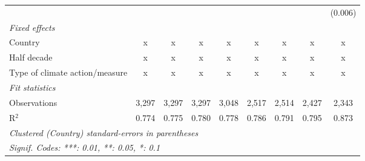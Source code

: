 \begin{table}[htbp]
\begin{tabular}{lcccccccc}
                                                                               &         &         &               &               &                &                &                & (0.006)\\   
      \emph{Fixed effects}\\
      Country                                                                  & x       & x       & x             & x             & x              & x              & x              & x\\  
      Half decade                                                              & x       & x       & x             & x             & x              & x              & x              & x\\  
      Type of climate action/measure                                           & x       & x       & x             & x             & x              & x              & x              & x\\  
      \midrule \emph{Fit statistics}\\
      Observations                                                             & 3,297   & 3,297   & 3,297         & 3,048         & 2,517          & 2,514          & 2,427          & 2,343\\  
      R$^2$                                                                    & 0.774   & 0.775   & 0.780         & 0.778         & 0.786          & 0.791          & 0.795          & 0.873\\  
      \midrule
      \multicolumn{9}{l}{\emph{Clustered (Country) standard-errors in parentheses}}\\
      \multicolumn{9}{l}{\emph{Signif. Codes: ***: 0.01, **: 0.05, *: 0.1}}\\
   \end{tabular}
\end{table}


